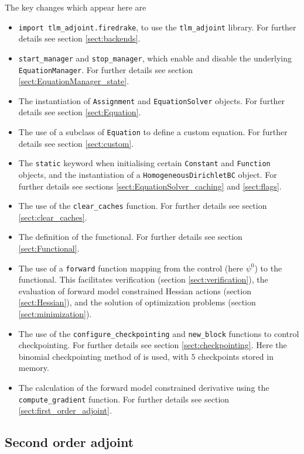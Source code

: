 \documentclass[11pt]{article}
\begin{document}
The key changes which appear here are
\begin{itemize}
  \item \texttt{import tlm\_adjoint.firedrake}, to use the
    \texttt{tlm\_adjoint} library. For further details see section
    \ref{sect:backends}.
  \item \texttt{start\_manager} and \texttt{stop\_manager}, which enable and
    disable the underlying \texttt{EquationManager}. For further details see
    section \ref{sect:EquationManager_state}.
  \item The instantiation of \texttt{Assignment} and \texttt{EquationSolver}
    objects. For further details see section \ref{sect:Equation}.
  \item The use of a subclass of \texttt{Equation} to define a custom equation.
    For further details see section \ref{sect:custom}.
  \item The \texttt{static} keyword when initialising certain \texttt{Constant}
    and \texttt{Function} objects, and the instantiation of a
    \texttt{HomogeneousDirichletBC} object. For further details see sections
    \ref{sect:EquationSolver_caching} and \ref{sect:flags}.
  \item The use of the \texttt{clear\_caches} function. For further details see
    section \ref{sect:clear_caches}.
  \item The definition of the functional. For further details see section
    \ref{sect:Functional}.
  \item The use of a \texttt{forward} function mapping from the control (here
    $\psi^0$) to the functional. This facilitates verification (section
    \ref{sect:verification}), the evaluation of forward model constrained
    Hessian actions (section \ref{sect:Hessian}), and the solution of
    optimization problems (section \ref{sect:minimization}).
  \item The use of the \texttt{configure\_checkpointing} and
    \texttt{new\_block} functions to control checkpointing. For further details
    see section \ref{sect:checkpointing}. Here the binomial checkpointing
    method of \citet{griewank2000} is used, with $5$ checkpoints stored in
    memory. 
  \item The calculation of the forward model constrained derivative using the
    \texttt{compute\_gradient} function. For further details see section
    \ref{sect:first_order_adjoint}.
\end{itemize}

\subsection{Second order adjoint}
\end{document}
